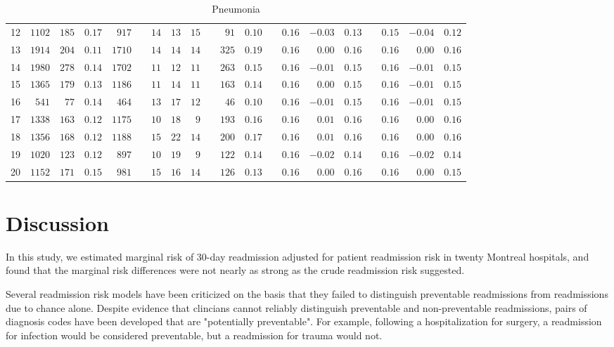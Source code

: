 \documentclass[]{article}\usepackage[]{graphicx}\usepackage[]{color}
\begin{document}
\begin{landscape}
\begin{table}[!tbp]
\begin{center}
\begin{tabular}{lrrrrcrrrcrrcrrrcrrr}
12&$1102$&$185$&$0.17$&$ 917$&&$14$&$13$&$15$&&$ 91$&$0.10$&&$0.16$&$-0.03$&$0.13$&&$0.15$&$-0.04$&$0.12$\tabularnewline
13&$1914$&$204$&$0.11$&$1710$&&$14$&$14$&$14$&&$325$&$0.19$&&$0.16$&$ 0.00$&$0.16$&&$0.16$&$ 0.00$&$0.16$\tabularnewline
14&$1980$&$278$&$0.14$&$1702$&&$11$&$12$&$11$&&$263$&$0.15$&&$0.16$&$-0.01$&$0.15$&&$0.16$&$-0.01$&$0.15$\tabularnewline
15&$1365$&$179$&$0.13$&$1186$&&$11$&$14$&$11$&&$163$&$0.14$&&$0.16$&$ 0.00$&$0.15$&&$0.16$&$-0.01$&$0.15$\tabularnewline
16&$ 541$&$ 77$&$0.14$&$ 464$&&$13$&$17$&$12$&&$ 46$&$0.10$&&$0.16$&$-0.01$&$0.15$&&$0.16$&$-0.01$&$0.15$\tabularnewline
17&$1338$&$163$&$0.12$&$1175$&&$10$&$18$&$ 9$&&$193$&$0.16$&&$0.16$&$ 0.01$&$0.16$&&$0.16$&$ 0.00$&$0.16$\tabularnewline
18&$1356$&$168$&$0.12$&$1188$&&$15$&$22$&$14$&&$200$&$0.17$&&$0.16$&$ 0.01$&$0.16$&&$0.16$&$ 0.00$&$0.16$\tabularnewline
19&$1020$&$123$&$0.12$&$ 897$&&$10$&$19$&$ 9$&&$122$&$0.14$&&$0.16$&$-0.02$&$0.14$&&$0.16$&$-0.02$&$0.14$\tabularnewline
20&$1152$&$171$&$0.15$&$ 981$&&$15$&$16$&$14$&&$126$&$0.13$&&$0.16$&$ 0.00$&$0.16$&&$0.16$&$ 0.00$&$0.15$\tabularnewline
\hline
\end{tabular}

\caption{Pneumonia\label{round}}\end{center}

\end{table}


\setmainfont[Scale=1.25]{Cambria}
\linespread{1.25}


\end{landscape}
\section{Discussion}

In this study, we estimated marginal risk of 30-day readmission adjusted for patient readmission risk in twenty Montreal hospitals, and found that the marginal risk differences were not nearly as strong as the crude readmission risk suggested.

Several readmission risk models have been criticized on the basis that they failed to distinguish preventable readmissions from readmissions due to chance alone. Despite evidence that clincians cannot reliably distinguish preventable and non-preventable readmissions, pairs of diagnosis codes have been developed that are "potentially preventable". For example, following a hospitalization for surgery, a readmission for infection would be considered preventable, but a readmission for trauma would not.
\end{document}
